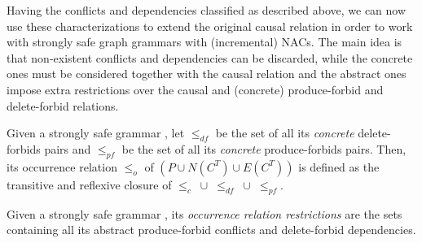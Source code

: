 Having the conflicts and dependencies classified as described above, we can now use these characterizations to extend the original causal relation in order to work with strongly safe graph grammars with (incremental) NACs. The main idea is that non-existent conflicts and dependencies can be discarded, while the concrete ones must be considered together with the causal relation and the abstract ones impose extra restrictions over the causal and (concrete) produce-forbid and delete-forbid relations.

\begin{definition} Given a strongly safe grammar \doublyTypedGraphGrammarCore{}, let $\leq_{df}$ be the set of all its \emph{concrete} delete-forbids pairs and $\leq_{pf}$ be the set of all its \emph{concrete} produce-forbids pairs. Then, its occurrence relation $\leq_o$ of $(P \cup N(C^T) \cup E(C^T))$ is defined as the transitive and reflexive closure of \mbox{$\leq_{c}$ $\cup$ $\leq_{df}$ $\cup$ $\leq_{pf}$}.
\end{definition}

\begin{definition} Given a strongly safe grammar \doublyTypedGraphGrammarCore{}, its \emph{occurrence relation restrictions} are the sets containing all its abstract produce-forbid conflicts and delete-forbid dependencies.
\end{definition}

